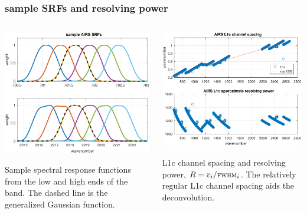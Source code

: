 \documentclass[10pt]{beamer}
\begin{document}
\begin{frame}
\frametitle{sample SRFs and resolving power}
\begin{columns}[t]
\begin{column}{0.5\textwidth}
  \begin{centering}
  \includegraphics[width=\textwidth]{figures/airs_sample_SRF.pdf} \\
  \end{centering}\vspace{2mm}
  Sample {\airs} spectral response functions from the low and high
  ends of the band.  The dashed line is the generalized Gaussian
  function.

\end{column}
\begin{column}{0.5\textwidth}  
  \begin{centering}
  \includegraphics[width=\textwidth]{figures/airs_L1c_res.pdf}
  \end{centering}\vspace{3mm}
  {\airs} L1c channel spacing and resolving power, $R =
  v_i/\mbox{\small\textsc{fwhm}}_i$.  The relatively regular L1c channel spacing aids the
  deconvolution. 


\end{column}
\end{columns}
\end{frame}
\end{document}
